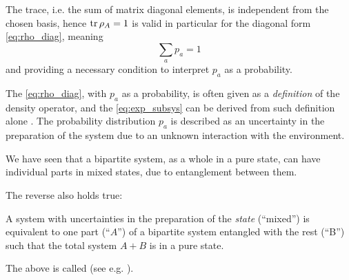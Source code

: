 The trace, i.e. the sum of matrix diagonal elements, is independent
from the chosen basis, hence $\tr\rho_A = 1$ is valid in particular
for the diagonal form \eqref{eq:rho_diag}, meaning
\[
  \sum_a p_a = 1
\]
and providing a necessary condition to interpret $p_a$ as a probability.

The \eqref{eq:rho_diag}, with $p_a$ as a probability, is often
given as a \emph{definition} of the density operator,
and the \eqref{eq:exp_subsys} can be derived from
such definition alone \parencite{open_systems}.
The probability distribution ${p_a}$
is described as an uncertainty in the preparation of the system
due to an unknown interaction with the environment.

We have seen that a bipartite system, as a whole in a pure state,
can have individual parts in mixed states, due to entanglement between them.

The reverse also holds true:
\begin{proposition}
A system with uncertainties in the preparation of the \emph{state}
(``mixed'') is equivalent to one part (``$A$'') of a bipartite system
entangled with the rest (``B'') such that the total system
$A+B$ is in a pure state.
\end{proposition}

The above is called  (see e.g. \cite[sec.2.5]{NielsenChuang}).

